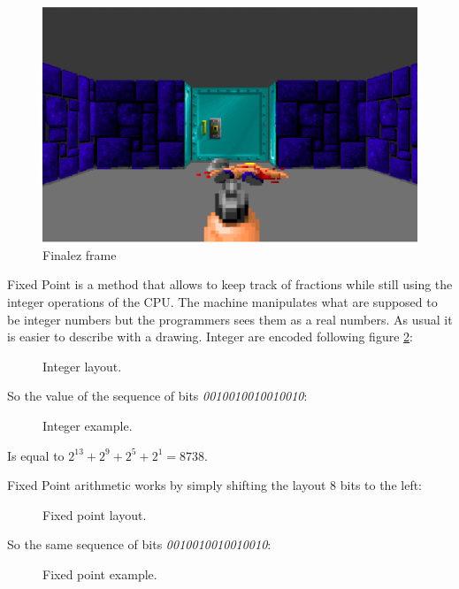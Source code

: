 \documentclass[book.tex]{subfiles}
\begin{document}
   \begin{figure}[H]
\centering
 \includegraphics[scale=1]{imgs/wolfd_4-2.eps}
 \caption{Finalez frame} \label{fig:mips}
 \end{figure}
   \bigskip
   
   
   

 

Fixed Point is a method that allows to keep track of fractions while still using the integer operations of the CPU. The machine manipulates what are supposed to be integer numbers but the programmers sees them as a real numbers. As usual it is easier to describe with a drawing. Integer are encoded following figure \ref{fig:int_layout}:
\begin{figure}[H]
\centering
 
 \caption{Integer layout.} \label{fig:int_layout}
 \end{figure}

So the value of the sequence of bits \emph{0010010010010010}:
\begin{figure}[H]
\centering

 \caption{Integer example.} \label{fig:mips}
 \end{figure}

 Is equal to $ 2^{13} + 2^9 + 2^5 + 2^1 =  8738 $.

\bigskip

Fixed Point arithmetic works by simply shifting the layout 8 bits to the left:
\begin{figure}[H]
 \centering
  
 \caption{Fixed point layout.} \label{fig:mips}
\end{figure}

So the same sequence of bits \emph{0010010010010010}:
\begin{figure}[H]
 \centering
   
  \caption{Fixed point example.} \label{fig:mips}
\end{figure} 
\end{document}
